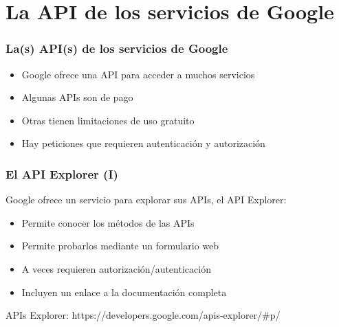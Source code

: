 %

\section{La API de los servicios de Google}


\begin{frame}
\frametitle{La(s) API(s) de los servicios de Google}

\begin{itemize}
  \item Google ofrece una API para acceder a muchos servicios
  \item Algunas APIs son de pago
  \item Otras tienen limitaciones de uso gratuito
  \item Hay peticiones que requieren autenticación y autorización
\end{itemize}

\end{frame}


\begin{frame}
\frametitle{El API Explorer (I)}

Google ofrece un servicio para explorar sus APIs, el API Explorer:

\begin{itemize}
  \item Permite conocer los métodos de las APIs
  \item Permite probarlos mediante un formulario web
  \item A veces requieren autorización/autenticación
  \item Incluyen un enlace a la documentación completa
\end{itemize}

APIs Explorer: https://developers.google.com/apis-explorer/\#p/

\end{frame}



